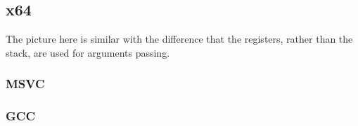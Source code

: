 \subsection{x64}

The picture here is similar with the difference that the registers, rather than the stack, are used for arguments passing.

\subsubsection{MSVC}



\subsubsection{GCC}



